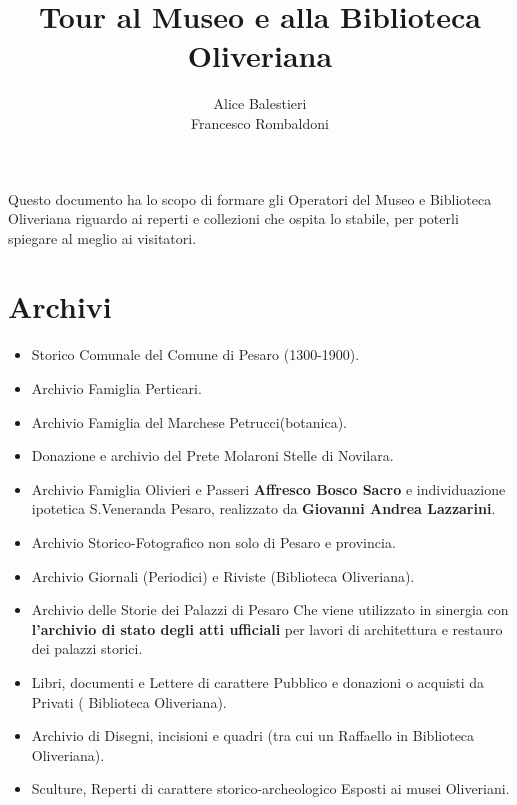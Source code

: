 \documentclass[hidelinks,12pt,a4paper]{article}
\begin{document}
	\begin{flushleft}
		
		\title{\textbf{Tour al Museo e alla Biblioteca Oliveriana}}
		\author{Alice Balestieri\\Francesco Rombaldoni}
		\date{} 
		 
	  	\maketitle
	    
		\setcounter{page}{1}
		\newpage
		\vspace*{\fill}
			Questo documento ha lo scopo di formare gli Operatori del Museo e Biblioteca Oliveriana riguardo ai reperti e collezioni che ospita lo stabile, per poterli spiegare al meglio ai visitatori.
		\vspace*{\fill}
		\newpage
		\tableofcontents
		\newpage
	
		\section{Archivi}
				
		\begin{itemize}
			\item Storico Comunale del Comune di Pesaro (1300-1900).
			\item Archivio Famiglia Perticari.
			\item Archivio Famiglia del Marchese Petrucci(botanica).
			\item Donazione e archivio del Prete Molaroni \textrightarrow Stelle di Novilara.
			\item Archivio Famiglia Olivieri e Passeri \textrightarrow \textbf{Affresco Bosco Sacro} e individuazione ipotetica S.Veneranda Pesaro, realizzato da \textbf{Giovanni Andrea Lazzarini}.
			\item Archivio Storico-Fotografico non solo di Pesaro e provincia.
			\item Archivio Giornali (Periodici) e Riviste (Biblioteca Oliveriana).
			\item Archivio delle Storie dei Palazzi di Pesaro \textrightarrow Che viene utilizzato in sinergia con \textbf{l'archivio di stato degli atti ufficiali} per lavori di architettura e restauro dei palazzi storici.
			\item Libri, documenti e Lettere di carattere Pubblico e donazioni o acquisti da Privati ( Biblioteca Oliveriana).
			\item Archivio di Disegni, incisioni e quadri (tra cui un Raffaello in Biblioteca Oliveriana).
		\item Sculture, Reperti di carattere storico-archeologico \textrightarrow Esposti ai musei Oliveriani.			
		\end{itemize}
	

\end{flushleft}
\end{document}
